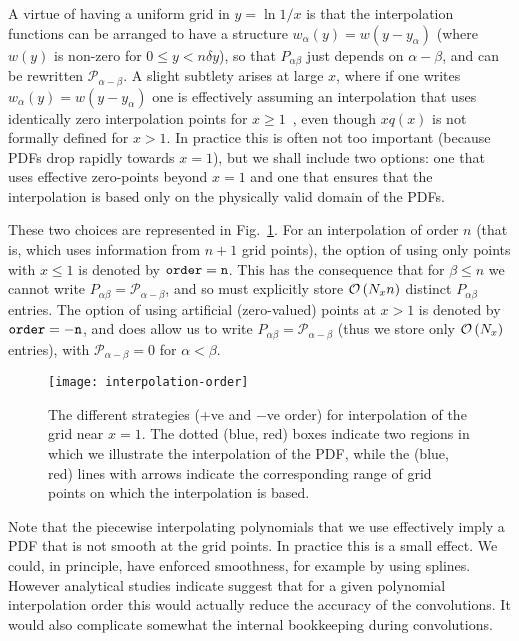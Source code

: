 \documentclass[12pt]{article}
\newcommand{\order}[1]{{\cal O}\left(#1\right)}
\begin{document}
A virtue
 of having a uniform grid in $y = \ln 1/x$ is that the
interpolation functions can be arranged to have a structure
$w_\alpha(y) = w(y - y_\alpha)$ (where $w(y)$ is non-zero for $0\le y <
n \delta y$), so that $P_{\alpha\beta}$ just depends
on $\alpha - \beta$, and can be rewritten $\mathcal{P}_{\alpha - \beta}$. A
slight subtlety arises at large $x$, where if one writes $w_\alpha(y) =
w(y - y_\alpha)$ one is effectively assuming an interpolation that uses
identically zero interpolation points for $x\ge 1$~\cite{coriano,
Ratcliffe:2000kp},
even though $xq(x)$ is not formally defined for $x > 1$. In practice
this is often not too important (because PDFs drop rapidly towards
$x=1$), but we shall include two options: one that uses effective
zero-points beyond $x=1$ and one that ensures that the interpolation
is based only on the physically valid domain of the PDFs.

These two choices are represented in
Fig.~\ref{fig:interpolation-orders}.  For an interpolation of order
$n$ (that is, which uses information from $n+1$ grid points), the
option of using only points with $x\le 1$ is denoted by $\tt order=n$.
This has the consequence that for $\beta \le n$ we cannot write
$P_{\alpha\beta} = \mathcal{P}_{\alpha-\beta}$, and so must explicitly
store $\order{N_x n}$ distinct $P_{\alpha\beta}$ entries.
%
The option of using artificial (zero-valued) points at $x>1$ is denoted by $\tt
order=-n$, and does allow us to write $P_{\alpha\beta} =
\mathcal{P}_{\alpha-\beta}$ (thus we store only $\order{N_x}$
entries), with $\mathcal{P}_{\alpha-\beta} = 0$ for $\alpha < \beta$.

\begin{figure}
  \centering
  \texttt{[image: interpolation-order]}%
  \caption{The different strategies (+ve and $-$ve order) for
    interpolation of the grid near $x=1$. The dotted (blue, red) boxes
    indicate two regions in which we illustrate the interpolation of
    the PDF, while the (blue, red) lines with arrows indicate the
    corresponding range of grid points on which the interpolation is
    based.}
  \label{fig:interpolation-orders}
\end{figure}


Note that the piecewise interpolating polynomials that we use effectively
imply a PDF that is not smooth at
the grid points. In practice this is a small effect. We could, in
principle, have enforced smoothness, for example by using
splines. However analytical studies indicate suggest that for a given
polynomial interpolation order this would actually reduce the accuracy
of the convolutions. It would also complicate somewhat the internal
bookkeeping during convolutions.
\end{document}
